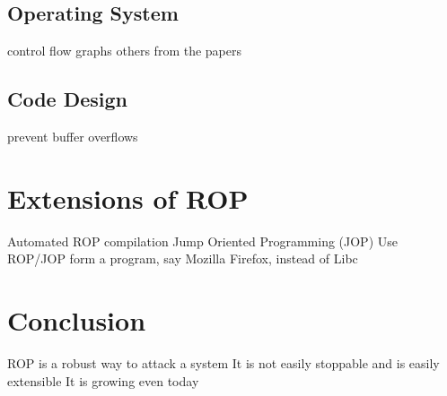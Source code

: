 \documentclass[11pt]{amsart}
\begin{document}
\subsection*{Operating System}
control flow graphs
others from the papers
\subsection*{Code Design}
prevent buffer overflows
\section*{Extensions of ROP}
Automated ROP compilation
Jump Oriented Programming (JOP)
Use ROP/JOP form a program, say Mozilla Firefox, instead of Libc
\section*{Conclusion}
ROP is a robust way to attack a system
It is not easily stoppable and is easily extensible
It is growing even today
\end{document}
